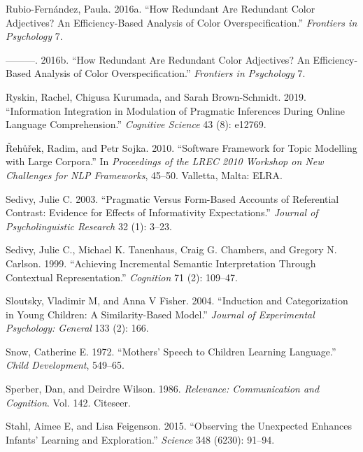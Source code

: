 \documentclass{ucetd}
\newlength{\cslhangindent}
\newenvironment{cslreferences}%
{\setlength{\parindent}{0pt}%
\everypar{\setlength{\hangindent}{\cslhangindent}}\ignorespaces}%
{\par}
\begin{document}
\begin{cslreferences}
\leavevmode\hypertarget{ref-rubio-fernandez_how_2016}{}%
Rubio-Fernández, Paula. 2016a. ``How Redundant Are Redundant Color
Adjectives? An Efficiency-Based Analysis of Color Overspecification.''
\emph{Frontiers in Psychology} 7.

\leavevmode\hypertarget{ref-rubio-fernandez2016}{}%
---------. 2016b. ``How Redundant Are Redundant Color Adjectives? An
Efficiency-Based Analysis of Color Overspecification.'' \emph{Frontiers
in Psychology} 7.

\leavevmode\hypertarget{ref-ryskin2019information}{}%
Ryskin, Rachel, Chigusa Kurumada, and Sarah Brown-Schmidt. 2019.
``Information Integration in Modulation of Pragmatic Inferences During
Online Language Comprehension.'' \emph{Cognitive Science} 43 (8):
e12769.

\leavevmode\hypertarget{ref-rehurek2010}{}%
Řehůřek, Radim, and Petr Sojka. 2010. ``Software Framework for Topic
Modelling with Large Corpora.'' In \emph{Proceedings of the LREC 2010
Workshop on New Challenges for NLP Frameworks}, 45--50. Valletta, Malta:
ELRA.

\leavevmode\hypertarget{ref-sedivy_pragmatic_2003}{}%
Sedivy, Julie C. 2003. ``Pragmatic Versus Form-Based Accounts of
Referential Contrast: Evidence for Effects of Informativity
Expectations.'' \emph{Journal of Psycholinguistic Research} 32 (1):
3--23.

\leavevmode\hypertarget{ref-sedivy_achieving_1999}{}%
Sedivy, Julie C., Michael K. Tanenhaus, Craig G. Chambers, and Gregory
N. Carlson. 1999. ``Achieving Incremental Semantic Interpretation
Through Contextual Representation.'' \emph{Cognition} 71 (2): 109--47.

\leavevmode\hypertarget{ref-sloutsky2004}{}%
Sloutsky, Vladimir M, and Anna V Fisher. 2004. ``Induction and
Categorization in Young Children: A Similarity-Based Model.''
\emph{Journal of Experimental Psychology: General} 133 (2): 166.

\leavevmode\hypertarget{ref-snow1972}{}%
Snow, Catherine E. 1972. ``Mothers' Speech to Children Learning
Language.'' \emph{Child Development}, 549--65.

\leavevmode\hypertarget{ref-sperber1986relevance}{}%
Sperber, Dan, and Deirdre Wilson. 1986. \emph{Relevance: Communication
and Cognition}. Vol. 142. Citeseer.

\leavevmode\hypertarget{ref-stahl2015}{}%
Stahl, Aimee E, and Lisa Feigenson. 2015. ``Observing the Unexpected
Enhances Infants' Learning and Exploration.'' \emph{Science} 348 (6230):
91--94.


\end{cslreferences}
\end{document}
